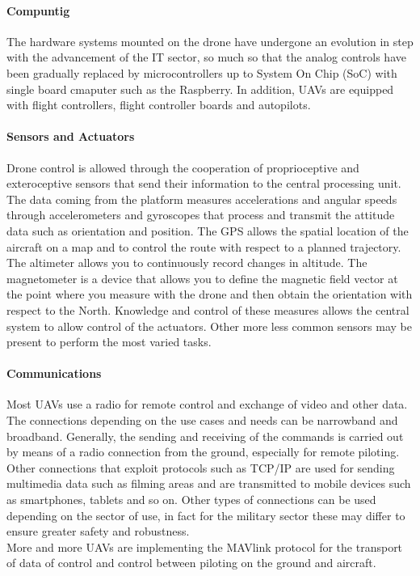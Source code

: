 \paragraph{Compuntig}
The hardware systems mounted on the drone have undergone an evolution in step
with the advancement of the IT sector, so much so that the analog controls have
been gradually replaced by microcontrollers up to System On Chip (SoC) with
single board cmaputer such as the Raspberry. In addition, UAVs are equipped with
flight controllers, flight controller boards and autopilots.
%
\paragraph{Sensors and Actuators}
Drone control is allowed through the cooperation of proprioceptive and
exteroceptive sensors that send their information to the central processing
unit.
The data coming from the platform measures accelerations and angular speeds
through accelerometers and gyroscopes that process and transmit the attitude
data such as orientation and position.
The GPS allows the spatial location of the aircraft on a map and to control the
route with respect to a planned trajectory. The altimeter allows you to
continuously record changes in altitude. The magnetometer is a device that
allows you to define the magnetic field vector at the point where you measure
with the drone and then obtain the orientation with respect to the North.
Knowledge and control of these measures allows the central system to allow
control of the actuators. Other more less common sensors may be present to
perform the most varied tasks.
%
\paragraph{Communications}
Most UAVs use a radio for remote control and exchange of video and other data.
The connections depending on the use cases and needs can be narrowband and
broadband. Generally, the sending and receiving of the commands is carried out
by means of a radio connection from the ground, especially for remote piloting.\\
Other connections that exploit protocols such as TCP/IP are used for sending
multimedia data such as filming areas and are transmitted to mobile devices such
as smartphones, tablets and so on.
Other types of connections can be used depending on the sector of use, in fact
for the military sector these may differ to ensure greater safety and
robustness.\\ 
More and more UAVs are implementing the MAVlink protocol for the
transport of data of control and control between piloting on the ground and
aircraft.
%
%
